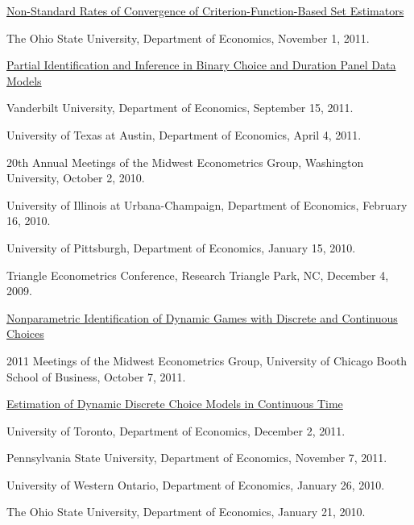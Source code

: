 \documentclass[10pt,letterpaper]{article}
\renewenvironment{itemize}{
  \begin{list}{}{
    \setlength{\leftmargin}{1.5em}
    \setlength{\itemsep}{0.25em}
    \setlength{\parskip}{0pt}
    \setlength{\parsep}{0.25em}
  }
}{
  \end{list}
}
\begin{document}
\begin{itemize}

\item \href{http://jblevins.org/research/cuberoot}{Non-Standard Rates of Convergence of Criterion-Function-Based Set Estimators}

  \begin{itemize}
  \item The Ohio State University, Department of Economics,
    November 1, 2011.
  \end{itemize}

\item \href{http://jblevins.org/research/panel}{Partial Identification and Inference in Binary Choice and Duration
    Panel Data Models}

  \begin{itemize}
  \item Vanderbilt University, Department of Economics,
    September 15, 2011.
  \item University of Texas at Austin, Department of Economics,
    April 4, 2011.
  \item 20th Annual Meetings of the Midwest Econometrics Group,
    Washington University,
    October 2, 2010.
  \item University of Illinois at Urbana-Champaign, Department of Economics,
    February 16, 2010.
  \item University of Pittsburgh, Department of Economics,
    January 15, 2010.
  \item Triangle Econometrics Conference,
    Research Triangle Park, NC,
    December 4, 2009.
  \end{itemize}

\item \href{http://jblevins.org/research/dcident}{Nonparametric Identification of Dynamic Games with Discrete and Continuous Choices}

  \begin{itemize}
    \item 2011 Meetings of the Midwest Econometrics Group,
      University of Chicago Booth School of Business,
      October 7, 2011.
  \end{itemize}

\item \href{http://jblevins.org/research/abbe}{Estimation of Dynamic Discrete Choice Models in Continuous Time}

  \begin{itemize}
  \item University of Toronto, Department of Economics,
    December 2, 2011.
  \item Pennsylvania State University, Department of Economics,
    November 7, 2011.
  \item University of Western Ontario, Department of Economics,
    January 26, 2010.
  \item The Ohio State University, Department of Economics,
    January 21, 2010.
  \end{itemize}


\end{itemize}
\end{document}
